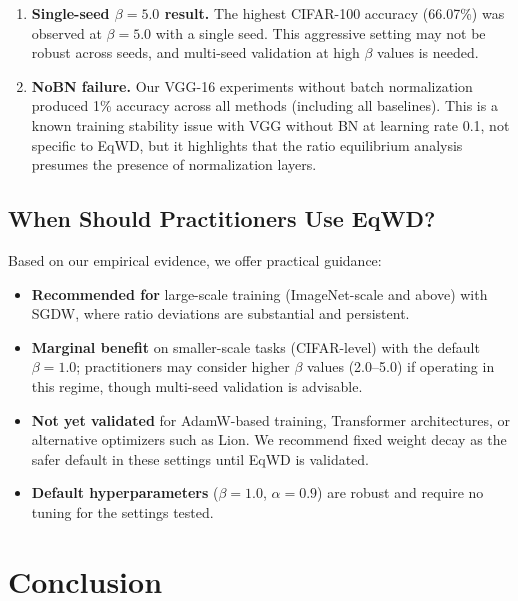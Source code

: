 \documentclass{article}
\begin{document}
\begin{enumerate}
  architectures (ResNet, VGG). Vision Transformers and large language
  models may exhibit different ratio dynamics due to their distinct
  layer structures (attention, LayerNorm vs.~BatchNorm).
\item
  \textbf{Single-seed $\beta = 5.0$ result.} The highest CIFAR-100
  accuracy (66.07\%) was observed at $\beta = 5.0$ with a single seed.
  This aggressive setting may not be robust across seeds, and multi-seed
  validation at high $\beta$ values is needed.
\item
  \textbf{NoBN failure.} Our VGG-16 experiments without batch
  normalization produced 1\% accuracy across all methods (including all
  baselines). This is a known training stability issue with VGG without
  BN at learning rate 0.1, not specific to EqWD, but it highlights that
  the ratio equilibrium analysis presumes the presence of normalization
  layers.
\end{enumerate}

\subsection{When Should Practitioners Use EqWD?}
\label{sec:practitioners}

Based on our empirical evidence, we offer practical guidance:

\begin{itemize}
\item
  \textbf{Recommended for} large-scale training (ImageNet-scale and
  above) with SGDW, where ratio deviations are substantial and
  persistent.
\item
  \textbf{Marginal benefit} on smaller-scale tasks (CIFAR-level) with
  the default $\beta = 1.0$; practitioners may consider higher
  $\beta$ values (2.0--5.0) if operating in this regime, though
  multi-seed validation is advisable.
\item
  \textbf{Not yet validated} for AdamW-based training, Transformer
  architectures, or alternative optimizers such as Lion. We recommend
  fixed weight decay as the safer default in these settings until EqWD
  is validated.
\item
  \textbf{Default hyperparameters} ($\beta = 1.0$, $\alpha = 0.9$)
  are robust and require no tuning for the settings tested.
\end{itemize}


\section{Conclusion}
\label{sec:conclusion}
\end{document}
